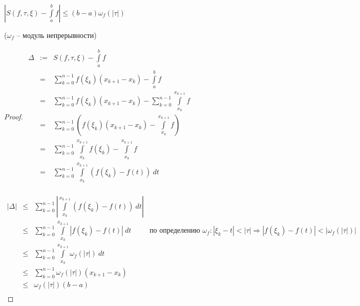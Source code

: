\newpage
{}

\begin{theorem} \thmslashn 

	$|S(f,\tau,\xi) - \int\limits_a^b f| \le (b-a)\omega_f(|\tau|)$

	($\omega_f$ -- модуль непрерывности)

	\begin{proof} \thmslashn
    
        $\begin{array}{rcll}
    	\Delta  &:=& S(f,\tau,\xi) - \int\limits_a^b f \\
    	        & =& \sum\limits_{k=0}^{n-1} f(\xi_k)(x_{k+1} - x_{k}) - \int\limits_a^b f \\
    	        & =& \sum\limits_{k=0}^{n-1} f(\xi_k)(x_{k+1} - x_{k}) - \sum\limits_{k=0}^{n-1} \int\limits_{x_{k}}^{x_{k+1}} f \\
    	        & =& \sum\limits_{k=0}^{n-1} (f(\xi_k)(x_{k+1} - x_{k}) - \int\limits_{x_{k}}^{x_{k+1}} f) \\
    	        & =& \sum\limits_{k=0}^{n-1} \int\limits_{x_{k}}^{x_{k+1}} f(\xi_k) - \int\limits_{x_{k}}^{x_{k+1}} f \\
    	        & =& \sum\limits_{k=0}^{n-1} \int\limits_{x_{k}}^{x_{k+1}} (f(\xi_k) -  f(t))\ dt \\
    	\end{array}$

        $\begin{array}{rcll}
    	|\Delta| &\le& \sum\limits_{k=0}^{n-1} |\int\limits_{x_{k}}^{x_{k+1}} (f(\xi_k) - f(t))\ dt| \\
    	         &\le& \sum\limits_{k=0}^{n-1} \int\limits_{x_{k}}^{x_{k+1}} |f(\xi_k) - f(t)|\ dt & \text{по определению } \omega_f : |\xi_k - t| < |\tau| \Rightarrow |f(\xi_k) - f(t)| < |\omega_f(|\tau|)| \\
    	         &\le& \sum\limits_{k=0}^{n-1} \int\limits_{x_{k}}^{x_{k+1}} \omega_f(|\tau|)\ dt\\
    	         &\le& \sum\limits_{k=0}^{n-1}  \omega_f(|\tau|)(x_{k+1} - x_{k}) \\
    	         &\le& \omega_f(|\tau|)(b-a) \\
    	\end{array}$

    \end{proof}

    \begin{consequence} \thmslashn
    	

\end{consequence}
\end{theorem}
